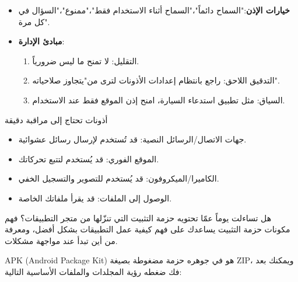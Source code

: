 \begin{itemize}
  \item \textbf{خيارات الإذن}:"السماح دائماً"،"السماح أثناء الاستخدام فقط"،"ممنوع"،"السؤال في كل مرة".
  \item \textbf{مبادئ الإدارة}:
  \begin{enumerate}
    \item التقليل: لا تمنح ما ليس ضرورياً.
    \item التدقيق اللاحق: راجع بانتظام إعدادات الأذونات لترى من"يتجاوز صلاحياته".
    \item السياق: مثل تطبيق استدعاء السيارة، امنح إذن الموقع فقط عند الاستخدام.
  \end{enumerate}
\end{itemize}

\begin{tcbwarn}{أذونات تحتاج إلى مراقبة دقيقة}
\begin{itemize}
  \item جهات الاتصال/الرسائل النصية: قد تُستخدم لإرسال رسائل عشوائية.
  \item الموقع الفوري: قد يُستخدم لتتبع تحركاتك.
  \item الكاميرا/الميكروفون: قد يُستخدم للتصوير والتسجيل الخفي.
  \item الوصول إلى الملفات: قد يقرأ ملفاتك الخاصة.
\end{itemize}

\end{tcbwarn}


هل تساءلت يوماً عمّا تحتويه حزمة التثبيت التي تنزّلها من متجر التطبيقات؟ فهم مكونات حزمة التثبيت يساعدك على فهم كيفية عمل التطبيقات بشكل أفضل، ومعرفة من أين تبدأ عند مواجهة مشكلات.


APK (Android Package Kit) هو في جوهره حزمة مضغوطة بصيغة ZIP، ويمكنك بعد فك ضغطه رؤية المجلدات والملفات الأساسية التالية:

